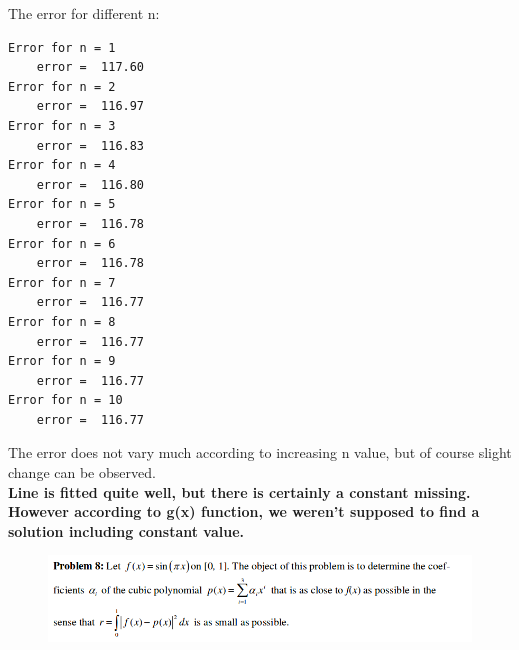 \documentclass[eng,openany]{mgr}
\begin{document}
\newpage
The error for different n:
\begin{lstlisting}
Error for n = 1
	error =  117.60
Error for n = 2
	error =  116.97
Error for n = 3
	error =  116.83
Error for n = 4
	error =  116.80
Error for n = 5
	error =  116.78
Error for n = 6
	error =  116.78
Error for n = 7
	error =  116.77
Error for n = 8
	error =  116.77
Error for n = 9
	error =  116.77
Error for n = 10
	error =  116.77
\end{lstlisting}

The error does not vary much according to increasing n value, but of course slight change can be observed.\\
\textbf{Line is fitted quite well, but there is certainly a constant missing. However according to g(x) function, we weren't supposed to find a solution including constant value.}
\newpage
\begin{figure}[h]
\centering
\includegraphics[width=0.7\linewidth]{screenshot023}
\label{fig:screenshot023}
\end{figure}
\end{document}
